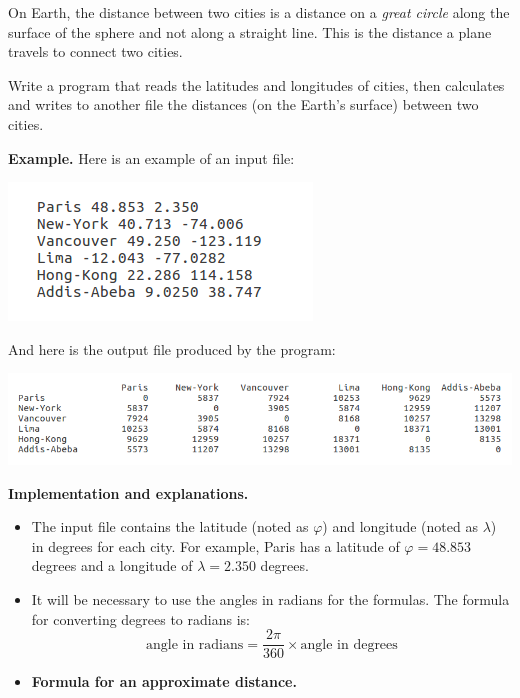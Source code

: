 \documentclass[11pt,class=report,crop=false]{standalone}
\begin{document}
\begin{activite}
\begin{enumerate}
On Earth, the distance between two cities is a distance on a \emph{great circle} along the surface of the sphere and not along a straight line. This is the distance a plane travels to connect two cities.

 Write a program that reads the latitudes and longitudes of cities, then calculates and writes to another file the distances (on the Earth's surface) between two cities. 
  
\textbf{Example.} Here is an example of an input file:
\begin{center}
\includegraphics[scale=\myscale,scale=0.7]{screen-files-4c}
\end{center}   

And here is the output file produced by the program:
\begin{center}
\includegraphics[scale=\myscale,scale=0.55]{screen-files-4d} 
\end{center}  
    
    
\textbf{Implementation and explanations.}

\begin{itemize}
	\item The input file contains the latitude (noted as $\varphi$) and longitude (noted as $\lambda$) in degrees for each city. For example, Paris has a latitude of $\varphi = 48.853$ degrees and a longitude of $\lambda = 2.350$ degrees.
	
	\item It will be necessary to use the angles in radians for the formulas. The formula for converting degrees to radians is: 
	$$\text{angle in radians} = \frac{2\pi}{360} \times \text{angle in degrees}$$
		
	\item \textbf{Formula for an approximate distance.}
	

\end{itemize}
\end{enumerate}
\end{activite}
\end{document}
